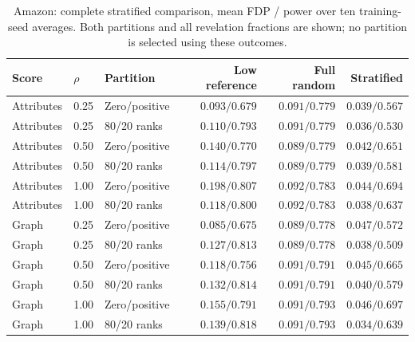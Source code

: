 \begin{table}[t]\centering\small
\caption{Amazon: complete stratified comparison, mean FDP / power over ten training-seed averages. Both partitions and all revelation fractions are shown; no partition is selected using these outcomes.}
\begin{tabular}{lllrrr}\toprule Score & $\rho$ & Partition & Low reference & Full random & Stratified\\\midrule
Attributes & 0.25 & Zero/positive & $0.093/0.679$ & $0.091/0.779$ & $0.039/0.567$ \\
Attributes & 0.25 & 80/20 ranks & $0.110/0.793$ & $0.091/0.779$ & $0.036/0.530$ \\
Attributes & 0.50 & Zero/positive & $0.140/0.770$ & $0.089/0.779$ & $0.042/0.651$ \\
Attributes & 0.50 & 80/20 ranks & $0.114/0.797$ & $0.089/0.779$ & $0.039/0.581$ \\
Attributes & 1.00 & Zero/positive & $0.198/0.807$ & $0.092/0.783$ & $0.044/0.694$ \\
Attributes & 1.00 & 80/20 ranks & $0.118/0.800$ & $0.092/0.783$ & $0.038/0.637$ \\
Graph & 0.25 & Zero/positive & $0.085/0.675$ & $0.089/0.778$ & $0.047/0.572$ \\
Graph & 0.25 & 80/20 ranks & $0.127/0.813$ & $0.089/0.778$ & $0.038/0.509$ \\
Graph & 0.50 & Zero/positive & $0.118/0.756$ & $0.091/0.791$ & $0.045/0.665$ \\
Graph & 0.50 & 80/20 ranks & $0.132/0.814$ & $0.091/0.791$ & $0.040/0.579$ \\
Graph & 1.00 & Zero/positive & $0.155/0.791$ & $0.091/0.793$ & $0.046/0.697$ \\
Graph & 1.00 & 80/20 ranks & $0.139/0.818$ & $0.091/0.793$ & $0.034/0.639$ \\
\bottomrule\end{tabular}\end{table}

